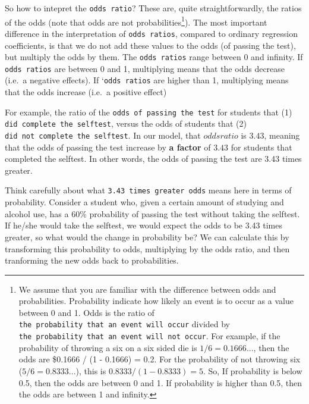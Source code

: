 \documentclass[
]{article}
\begin{document}
So how to intepret the \texttt{odds\ ratio}? These are, quite
straightforwardly, the ratios of the odds (note that odds are not
probabilities\footnote{We assume that you are familiar with the
  difference between odds and probabilities. Probability indicate how
  likely an event is to occur as a value between 0 and 1. Odds is the
  ratio of \texttt{the\ probability\ that\ an\ event\ will\ occur}
  divided by
  \texttt{the\ probability\ that\ an\ event\ will\ not\ occur}. For
  example, if the probability of throwing a six on a six sided die is
  \(1 / 6 = 0.1666...\), then the odds are \$0.1666 / (1 - 0.1666) =
  0.2. For the probability of not throwing six (\(5 / 6 = 0.8333...\)),
  this is \(0.8333 / (1 - 0.8333) = 5\). So, If probability is below
  0.5, then the odds are between 0 and 1. If probability is higher than
  0.5, then the odds are between 1 and infinity.}). The most important
difference in the interpretation of \texttt{odds\ ratios}, compared to
ordinary regression coefficients, is that we do not add these values to
the odds (of passing the test), but multiply the odds by them. The
\texttt{odds\ ratios} range between 0 and infinity. If
\texttt{odds\ ratios} are between 0 and 1, multiplying means that the
odds decrease (i.e.~a negative effects). If `\texttt{odds\ ratios} are
higher than 1, multiplying means that the odds increase (i.e.~a positive
effect)

For example, the ratio of the \texttt{odds\ of\ passing\ the\ test} for
students that (1) \texttt{did\ complete\ the\ selftest}, versus the odds
of students that (2) \texttt{did\ not\ complete\ the\ selftest}. In our
model, that \(odds ratio\) is \(3.43\), meaning that the odds of passing
the test increase by \textbf{a factor} of \(3.43\) for students that
completed the selftest. In other words, the odds of passing the test are
3.43 times greater.

Think carefully about what \texttt{3.43\ times\ greater\ odds} means
here in terms of probability. Consider a student who, given a certain
amount of studying and alcohol use, has a 60\% probability of passing
the test without taking the selftest. If he/she would take the selftest,
we would expect the odds to be 3.43 times greater, so what would the
change in probability be? We can calculate this by transforming this
probability to odds, multiplying by the odds ratio, and then tranforming
the new odds back to probabilities.
\end{document}
